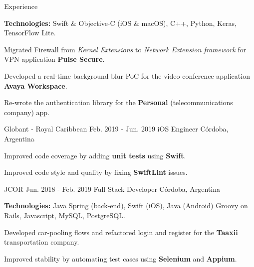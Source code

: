 \documentclass{curriculum}
\begin{document}
\begin{cvsection}{Experience}
        \begin{sectionitemlist}
        \item{
            \textbf{Technologies:} Swift \& Objective-C (iOS \& macOS), C++,
            Python, Keras, TensorFlow Lite.
        }
        \item{
            Migrated Firewall from \textit{Kernel Extensions} to \textit{Network Extension framework}
            for VPN application \textbf{Pulse Secure}.
        }
        \item{
            Developed a real-time background blur PoC for the video
            conference application \textbf{Avaya Workspace}.
        }
        \item{
            Re-wrote the authentication library for the \textbf{Personal}
            (telecommunications company) app.
        }
        \end{sectionitemlist}


    \makesectionitemheader
        {Globant - Royal Caribbean}            {Feb. 2019 - Jun. 2019}
        {iOS Engineer}                         {Córdoba, Argentina}

        \begin{sectionitemlist}
        \item{Improved code coverage by adding \textbf{unit tests} using \textbf{Swift}.}
        \item{Improved code style and quality by fixing \textbf{SwiftLint} issues.}
        \end{sectionitemlist}


    \makesectionitemheader
        {JCOR}                               {Jun. 2018 - Feb. 2019}
        {Full Stack Developer}               {Córdoba, Argentina}

        \begin{sectionitemlist}
        \item{
            \textbf{Technologies:} Java Spring (back-end), Swift (iOS), Java (Android)
            Groovy on Rails, Javascript, MySQL, PostgreSQL.
        }
        \item{
            Developed car-pooling flows and refactored login and register for the
            \textbf{Taaxii} transportation company.
        }
        \item{
            Improved stability by automating test cases using
            \textbf{Selenium} and \textbf{Appium}.
        }
        \end{sectionitemlist}

\end{cvsection}
\end{document}
